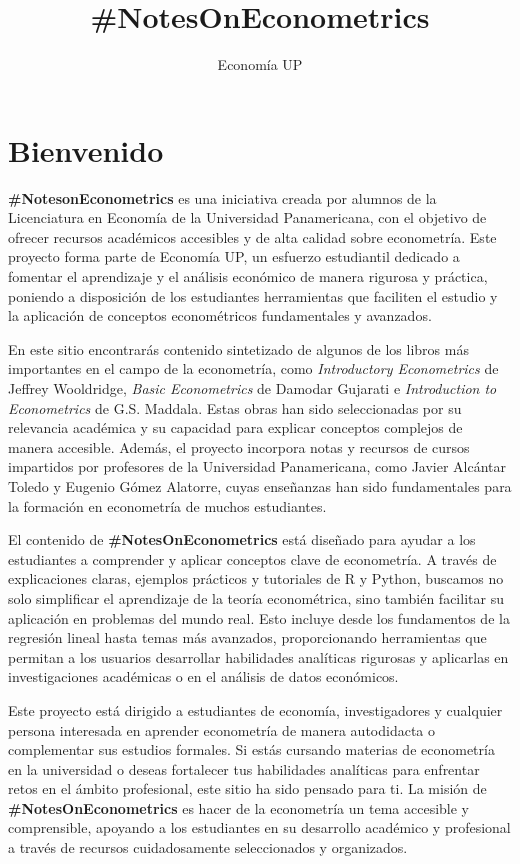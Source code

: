 \documentclass[
]{book}
\title{\#NotesOnEconometrics}
\author{Economía UP}
\date{}
\begin{document}
\maketitle

{
\setcounter{tocdepth}{1}
\tableofcontents
}
\hypertarget{bienvenido}{%
\chapter{Bienvenido}\label{bienvenido}}

\textbf{\#NotesonEconometrics} es una iniciativa creada por alumnos de la Licenciatura en Economía de la Universidad Panamericana, con el objetivo de ofrecer recursos académicos accesibles y de alta calidad sobre econometría. Este proyecto forma parte de Economía UP, un esfuerzo estudiantil dedicado a fomentar el aprendizaje y el análisis económico de manera rigurosa y práctica, poniendo a disposición de los estudiantes herramientas que faciliten el estudio y la aplicación de conceptos econométricos fundamentales y avanzados.

En este sitio encontrarás contenido sintetizado de algunos de los libros más importantes en el campo de la econometría, como \emph{Introductory Econometrics} de Jeffrey Wooldridge, \emph{Basic Econometrics} de Damodar Gujarati e \emph{Introduction to Econometrics} de G.S. Maddala. Estas obras han sido seleccionadas por su relevancia académica y su capacidad para explicar conceptos complejos de manera accesible. Además, el proyecto incorpora notas y recursos de cursos impartidos por profesores de la Universidad Panamericana, como Javier Alcántar Toledo y Eugenio Gómez Alatorre, cuyas enseñanzas han sido fundamentales para la formación en econometría de muchos estudiantes.

El contenido de \textbf{\#NotesOnEconometrics} está diseñado para ayudar a los estudiantes a comprender y aplicar conceptos clave de econometría. A través de explicaciones claras, ejemplos prácticos y tutoriales de R y Python, buscamos no solo simplificar el aprendizaje de la teoría econométrica, sino también facilitar su aplicación en problemas del mundo real. Esto incluye desde los fundamentos de la regresión lineal hasta temas más avanzados, proporcionando herramientas que permitan a los usuarios desarrollar habilidades analíticas rigurosas y aplicarlas en investigaciones académicas o en el análisis de datos económicos.

Este proyecto está dirigido a estudiantes de economía, investigadores y cualquier persona interesada en aprender econometría de manera autodidacta o complementar sus estudios formales. Si estás cursando materias de econometría en la universidad o deseas fortalecer tus habilidades analíticas para enfrentar retos en el ámbito profesional, este sitio ha sido pensado para ti. La misión de \textbf{\#NotesOnEconometrics} es hacer de la econometría un tema accesible y comprensible, apoyando a los estudiantes en su desarrollo académico y profesional a través de recursos cuidadosamente seleccionados y organizados.
\end{document}
